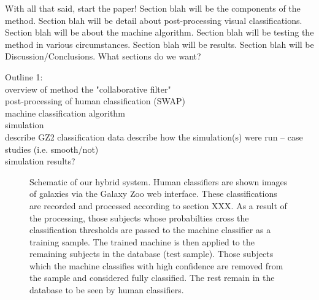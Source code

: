 \documentclass[twocolumn]{aastex6}
\begin{document}
With all that said, start the paper! Section blah will be the components of the method. Section blah will be detail about post-processing visual classifications. Section blah will be about the machine algorithm. Section blah will be testing the method in various circumstances. Section blah will be results. Section blah will be Discussion/Conclusions. 
What sections do we want? 

 Outline 1: \\
overview of method 
\indent the "collaborative filter" \\
\indent  post-processing of human classification (SWAP) \\
\indent machine classification algorithm \\
simulation \\
\indent describe GZ2 classification data
\indent describe  how the simulation(s) were run -- case studies (i.e. smooth/not) \\
\indent simulation results? \\



\begin{figure*}[ht!]
\caption{Schematic of our hybrid system. Human classifiers are shown images of galaxies via the Galaxy Zoo web interface. These  classifications are recorded and processed according to section XXX. As a result of the processing, those subjects whose probabilties cross the classification thresholds are passed to the machine classifier as a training sample. The trained machine is then applied to the remaining subjects in the database (test sample). Those subjects which the machine classifies with high confidence are removed from the sample and considered fully classified. The rest remain in the database to be seen by human classifiers. \label{fig:schematic}}
\end{figure*}
\end{document}
